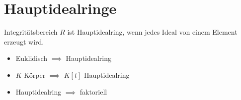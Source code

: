 \section*{Hauptidealringe}
Integritätsbereich $R$ ist Hauptidealring, wenn jedes Ideal von einem Element erzeugt wird.

\begin{itemize}
	\item Euklidisch $\implies$ Hauptidealring
	\item $K$ Körper $\implies$ $K[t]$ Hauptidealring
	\item Hauptidealring $\implies$ faktoriell
\end{itemize}
